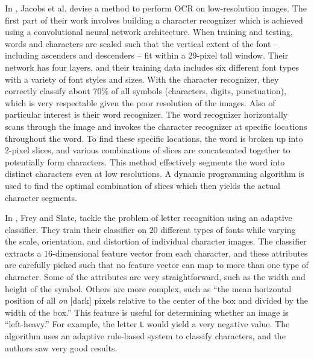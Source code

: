 \documentclass[12pt]{IEEEtran}
\begin{document}
In \cite{1}, Jacobs et al. devise a method to perform OCR on low-resolution images. The first part of their work involves building a character recognizer which is achieved using a convolutional neural network architecture. When training and testing, words and characters are scaled such that the vertical extent of the font -- including ascenders and descenders -- fit within a 29-pixel tall window. Their network has four layers, and their training data includes six different font types with a variety of font styles and sizes. With the character recognizer, they  correctly classify about 70\% of all symbols (characters, digits, punctuation), which is very respectable given the poor resolution of the images. Also of particular interest is their word recognizer. The word recognizer horizontally scans through the image and invokes the character recognizer at specific locations throughout the word. To find these specific locations, the word is broken up into 2-pixel slices, and various combinations of slices are concatenated together to potentially form characters. This method effectively segments the word into distinct characters even at low resolutions. A dynamic programming algorithm is used to find the optimal combination of slices which then yields the actual character segments.

In \cite{2}, Frey and Slate, tackle the problem of letter recognition using an adaptive classifier. They train their classifier on $20$ different types of fonts while varying the scale, orientation, and distortion of individual character images. The classifier extracts a $16$-dimensional feature vector from each character, and these attributes are carefully picked such that no feature vector can map to more than one type of character. Some of the attributes are very straightforward, such as the width and height of the symbol. Others are more complex, such as ``the mean horizontal position of all \textit{on} [dark] pixels relative to the center of the box and
divided by the width of the box.'' This feature is useful for determining whether an image is ``left-heavy.'' For example, the letter \texttt{L} would yield a very negative value. The algorithm uses an adaptive rule-based system to classify characters, and the authors saw very good results.
\end{document}
